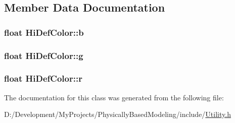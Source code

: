 \subsection{Member Data Documentation}
\hypertarget{class_hi_def_color_a783305313073eed854522db82459c185}{
\subsubsection[{b}]{\setlength{\rightskip}{0pt plus 5cm}float Hi\-Def\-Color\-::b}}\label{class_hi_def_color_a783305313073eed854522db82459c185}
\hypertarget{class_hi_def_color_a63606164cca043b989cc904f6dfd1b12}{
\subsubsection[{g}]{\setlength{\rightskip}{0pt plus 5cm}float Hi\-Def\-Color\-::g}}\label{class_hi_def_color_a63606164cca043b989cc904f6dfd1b12}
\hypertarget{class_hi_def_color_ab04783d755f14245ce7482aa68e5bbd7}{
\subsubsection[{r}]{\setlength{\rightskip}{0pt plus 5cm}float Hi\-Def\-Color\-::r}}\label{class_hi_def_color_ab04783d755f14245ce7482aa68e5bbd7}


The documentation for this class was generated from the following file\-:\begin{DoxyCompactItemize}
\item 
D\-:/\-Development/\-My\-Projects/\-Physically\-Based\-Modeling/include/\hyperlink{_utility_8h}{Utility.\-h}\end{DoxyCompactItemize}

